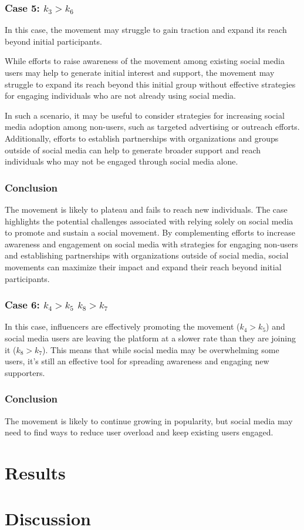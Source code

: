 \documentclass{article}
\begin{document}
    \subsubsection*{Case 5: $k_3 > k_6$}
    \begin{tcolorbox}
    In this case, the movement may struggle to gain traction and expand its reach beyond initial participants.
    
    While efforts to raise awareness of the movement among existing social media users may help to generate initial interest and support, the movement may struggle to expand its reach beyond this initial group without effective strategies for engaging individuals who are not already using social media.
    
    In such a scenario, it may be useful to consider strategies for increasing social media adoption among non-users, such as targeted advertising or outreach efforts. Additionally, efforts to establish partnerships with organizations and groups outside of social media can help to generate broader support and reach individuals who may not be engaged through social media alone.
    \subsubsection*{Conclusion}
    The movement is likely to plateau and fails to reach new individuals. The case highlights the potential challenges associated with relying solely on social media to promote and sustain a social movement. By complementing efforts to increase awareness and engagement on social media with strategies for engaging non-users and establishing partnerships with organizations outside of social media, social movements can maximize their impact and expand their reach beyond initial participants.
    \end{tcolorbox}

    \subsubsection*{Case 6: $k_4 > k_5$  $k_8 > k_7$}
    \begin{tcolorbox}
    In this case, influencers are effectively promoting the movement ($k_4 > k_5$) and social media users are leaving the platform at a slower rate than they are joining it ($k_8 > k_7$). This means that while social media may be overwhelming some users, it's still an effective tool for spreading awareness and engaging new supporters.
    \subsubsection*{Conclusion}
    The movement is likely to continue growing in popularity, but social media may need to find ways to reduce user overload and keep existing users engaged.
    \end{tcolorbox}

    \section{Results}
    \section{Discussion}
    \newpage
    
    
    
\end{document}

